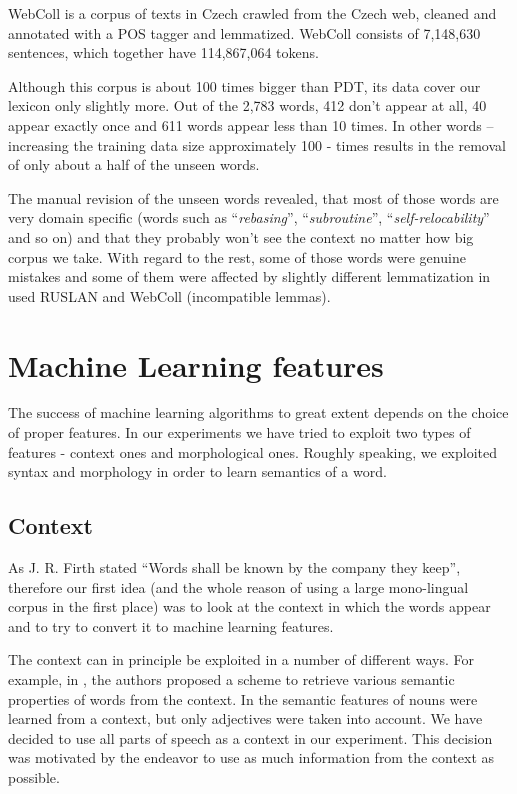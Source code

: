 \documentclass[letterpaper]{article}
\begin{document}
WebColl\cite{webcoll} is a corpus of texts in Czech crawled from the Czech web, cleaned and annotated  with a POS tagger and lemmatized.
WebColl consists of 7,148,630 sentences, which together have 114,867,064 tokens. 

Although this corpus is about 100 times bigger than PDT, its data cover our lexicon only slightly more. Out of the 2,783 words, 412 don't appear at all, 
40 appear exactly once and 611 words appear less than 10 times. In other words -- increasing the training data size approximately 100 - times results in the removal of only about a half of the unseen words.

The manual revision of the unseen words revealed, that most of those words are very domain specific 
(words such as ``\emph{rebasing}'', ``\emph{subroutine}'', ``\emph{self-relocability}'' and so on) 
and that they probably won't see the context no matter how big corpus we take. With regard to the rest, some of those words were genuine mistakes and some of them were affected by slightly different lemmatization in used RUSLAN and WebColl (incompatible lemmas).


\section{Machine Learning features}
The success of machine learning algorithms to great extent depends on the 
choice of proper 
features.
In our experiments we have tried to exploit two types of features 
- context ones and morphological ones. 
Roughly speaking, we exploited syntax and morphology in order to learn semantics of a word.  

\subsection{Context}
As J. R. Firth stated ``Words shall be known by the company they keep'',
therefore our first idea (and the whole reason of using a large mono-lingual corpus in the first place) 
was to look at the context in which the words appear and to try to convert it to machine learning features.

The context can in principle be exploited in a number of different ways. For example, 
in \cite{baroni:2009}, the authors proposed a scheme to retrieve
various semantic properties of words from the context.
In \cite{biemann05} the semantic features of nouns were learned
from a context, but only adjectives were taken into account.
We have decided to use all parts of speech as a context in our experiment. This decision was motivated by the 
endeavor to use as much information from the context as possible. 
\end{document}
